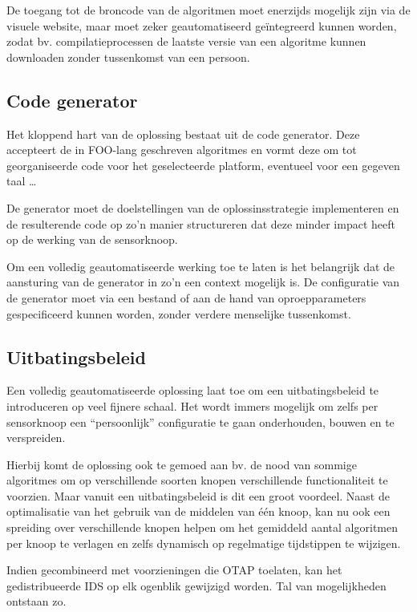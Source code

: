 De toegang tot de broncode van de algoritmen moet enerzijds mogelijk zijn via
de visuele website, maar moet zeker geautomatiseerd ge\"integreerd kunnen
worden, zodat bv. compilatieprocessen de laatste versie van een algoritme
kunnen downloaden zonder tussenkomst van een persoon.

\subsection{Code generator}
\label{subsection:arch-codegen}

Het kloppend hart van de oplossing bestaat uit de code generator. Deze
accepteert de in FOO-lang geschreven algoritmes en vormt deze om tot
georganiseerde code voor het geselecteerde platform, eventueel voor een gegeven
taal \dots

De generator moet de doelstellingen van de oplossinsstrategie implementeren en
de resulterende code op zo'n manier structureren dat deze minder impact heeft
op de werking van de sensorknoop.

Om een volledig geautomatiseerde werking toe te laten is het belangrijk dat de
aansturing van de generator in zo'n een context mogelijk is. De configuratie
van de generator moet via een bestand of aan de hand van oproepparameters
gespecificeerd kunnen worden, zonder verdere menselijke tussenkomst.

\subsection{Uitbatingsbeleid}
\label{subsection:arch-policy}

Een volledig geautomatiseerde oplossing laat toe om een uitbatingsbeleid te
introduceren op veel fijnere schaal. Het wordt immers mogelijk om zelfs per
sensorknoop een ``persoonlijk'' configuratie te gaan onderhouden, bouwen en te
verspreiden.

Hierbij komt de oplossing ook te gemoed aan bv. de nood van sommige algoritmes
om op verschillende soorten knopen verschillende functionaliteit te voorzien.
Maar vanuit een uitbatingsbeleid is dit een groot voordeel. Naast de
optimalisatie van het gebruik van de middelen van \'e\'en knoop, kan nu ook een
spreiding over verschillende knopen helpen om het gemiddeld aantal algoritmen
per knoop te verlagen en zelfs dynamisch op regelmatige tijdstippen te wijzigen.

Indien gecombineerd met voorzieningen die OTAP toelaten, kan het
gedistribueerde IDS op elk ogenblik gewijzigd worden. Tal van mogelijkheden
ontstaan zo.

